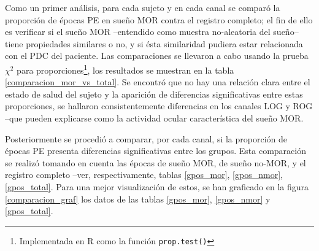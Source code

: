Como un primer an\'alisis, para cada sujeto y en cada canal 
se compar\'o la proporci\'on de \'epocas PE en sue\~no MOR contra el registro completo;
el fin de ello es verificar si el sue\~no MOR --entendido como muestra no-aleatoria
del sue\~no-- tiene propiedades similares o no, y si \'esta similaridad pudiera estar
relacionada con el PDC del paciente. 
Las comparaciones se llevaron a cabo usando la prueba $\chi^{2}$ para 
proporciones\footnote{Implementada en R como la funci\'on \texttt{prop.test()}},
los resultados se muestran en la tabla \ref{comparacion_mor_vs_total}.
Se encontr\'o que no hay una relaci\'on clara entre el estado de salud del sujeto y
la aparici\'on de diferencias significativas entre estas proporciones, se hallaron
consistentemente diferencias en los canales LOG y ROG --que pueden explicarse como la actividad
ocular caracter\'istica del sue\~no MOR.


Posteriormente se procedi\'o a comparar, por cada canal, si la proporci\'on de \'epocas PE
presenta diferencias significativas entre los grupos. Esta comparaci\'on se realiz\'o tomando
en cuenta las \'epocas de sue\~no MOR, de sue\~no no-MOR, y el registro completo 
--ver, respectivamente, tablas \ref{gpos_mor}, \ref{gpos_nmor}, \ref{gpos_total}.
Para una mejor visualizaci\'on de estos, se han graficado
en la figura \ref{comparacion_graf}
los datos de las tablas \ref{gpos_mor}, \ref{gpos_nmor} y
\ref{gpos_total}.

